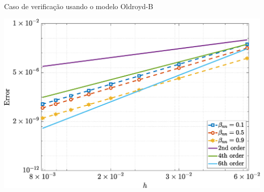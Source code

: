 \begin{frame}{Caso de verificação usando o modelo Oldroyd-B}
\begin{minipage}{0.325\textwidth}
        \label{oldroydb_txy_Case11}
    \end{minipage}
    \hfill
    \begin{minipage}{0.325\textwidth}
        \centering
        \includegraphics[width=\textwidth]{Figures/NormErr_2nd_Re_100_Wi_1_epsilon_0_xi_0_alphaG_0_Dt_1e-06_at_0.05_tipsim_1_MMS_12_Tyy.eps}
        \label{oldroydb_tyy_Case11}
    \end{minipage}
\end{frame}


